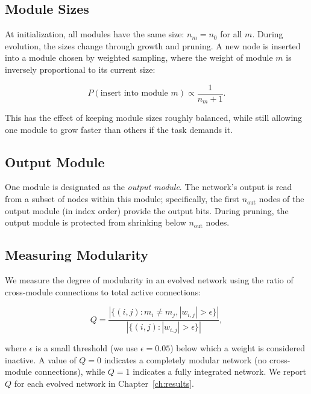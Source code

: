 \subsection{Module Sizes}

At initialization, all modules have the same size: $n_m = n_0$ for all
$m$. During evolution, the sizes change through growth and pruning.
A new node is inserted into a module chosen by weighted sampling, where
the weight of module $m$ is inversely proportional to its current size:

\begin{equation}
  P(\text{insert into module } m) \propto \frac{1}{n_m + 1}.
  \label{eq:module-growth-priority}
\end{equation}

This has the effect of keeping module sizes roughly balanced, while
still allowing one module to grow faster than others if the task
demands it.

\subsection{Output Module}

One module is designated as the \emph{output module}. The network's
output is read from a subset of nodes within this module; specifically,
the first $n_{\text{out}}$ nodes of the output module (in index order)
provide the output bits. During pruning, the output module is protected
from shrinking below $n_{\text{out}}$ nodes.

\subsection{Measuring Modularity}

We measure the degree of modularity in an evolved network using the
ratio of cross-module connections to total active connections:

\begin{equation}
  Q = \frac{\left| \{(i,j) : m_i \neq m_j, |w_{i,j}| > \epsilon\} \right|}
           {\left| \{(i,j) : |w_{i,j}| > \epsilon\} \right|},
  \label{eq:modularity-metric}
\end{equation}

where $\epsilon$ is a small threshold (we use $\epsilon = 0.05$) below
which a weight is considered inactive. A value of $Q = 0$ indicates a
completely modular network (no cross-module connections), while $Q = 1$
indicates a fully integrated network. We report $Q$ for each evolved
network in Chapter~\ref{ch:results}.

